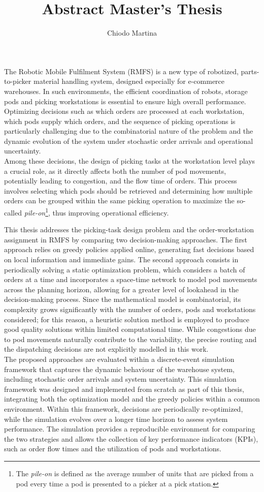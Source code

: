 \documentclass[11pt]{article}
\title{Abstract Master's Thesis}
\author{Chiodo Martina}
\date{}
\begin{document}
\maketitle

The Robotic Mobile Fulfilment System (RMFS) is a new type of robotized, parts-to-picker material handling system, designed especially for e-commerce warehouses.  In such environments, the efficient coordination of robots, storage pods and picking workstations is essential to ensure high overall performance. Optimizing decisions such as which orders are processed at each workstation, which pods supply which orders, and the sequence of picking operations is particularly challenging due to the combinatorial nature of the problem and the dynamic evolution of the system under stochastic order arrivals and operational uncertainty. \\
Among these decisions, the design of picking tasks at the workstation level plays a crucial role, as it directly affects both the number of pod movements, potentially leading to congestion, and the flow time of orders. This process involves selecting which pods should be retrieved and determining how multiple orders can be grouped within the same picking operation to maximize the so-called \textit{pile-on}\footnote{The \textit{pile-on} is defined as the average number of units that are picked from a pod every time a pod is presented to a picker at a pick station.}, thus improving operational efficiency. 

This thesis addresses the picking-task design problem and the order-workstation assignment in RMFS by comparing two decision-making approaches. The first approach relies on greedy policies applied online, generating fast decisions based on local information and immediate gains. The second approach consists in periodically solving a static optimization problem, which considers a batch of orders at a time and incorporates a space-time network to model pod movements across the planning horizon, allowing for a greater level of lookahead in the decision-making process. Since the mathematical model is combinatorial, its complexity grows significantly with the number of orders, pods and workstations considered; for this reason, a heuristic solution method is employed to produce good quality solutions within limited computational time.  
While congestions due to pod movements naturally contribute to the variability, the precise routing and the dispatching decisions are not explicitly modelled in this work. \\ 
The proposed approaches are evaluated within a discrete-event simulation framework that captures the dynamic behaviour of the warehouse system, including stochastic order arrivals and system uncertainty. This simulation framework was designed and implemented from scratch as part of this thesis, integrating both the optimization model and the greedy policies within a common environment. Within this framework, decisions are periodically re-optimized, while the simulation evolves over a longer time horizon to assess system performance. The simulation provides a reproducible environment for comparing the two strategies and allows the collection of key performance indicators (KPIs), such as order flow times and the utilization of pods and workstations. 
\end{document}
